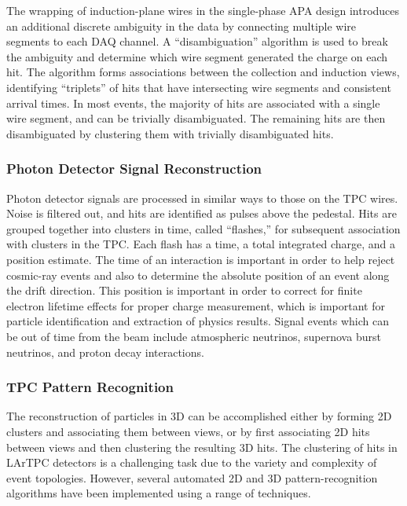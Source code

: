 The wrapping of induction-plane wires in the single-phase APA design
introduces an additional discrete ambiguity in the data by connecting multiple wire
segments to each DAQ channel. A ``disambiguation'' algorithm is used to break the
ambiguity and determine which wire segment generated the charge on each hit.
The algorithm forms associations between the collection and induction views,
identifying ``triplets'' of hits that have intersecting wire segments
and consistent arrival times. In most events, the majority of hits are
associated with a single wire segment, and can be trivially disambiguated.
The remaining hits are then disambiguated by clustering them with trivially disambiguated hits.

\subsubsection{Photon Detector Signal Reconstruction}

Photon detector signals are processed in similar ways to those on the TPC wires.
Noise is filtered out, and hits are identified as pulses above the pedestal.
Hits are grouped together into clusters in time, called ``flashes,'' for subsequent
association with clusters in the TPC.  Each flash has a time, a total integrated charge, and a position
estimate.  The time of an interaction is important in order to help reject cosmic-ray events
and also to determine the absolute position of an event along the drift direction.  This position
is important in order to correct for finite electron lifetime effects for proper charge measurement,
which is important for particle identification and extraction of physics results.  Signal events which
can be out of time from the beam include atmospheric neutrinos, supernova burst neutrinos, and proton decay
interactions.

\subsubsection{TPC Pattern Recognition}

The reconstruction of particles in 3D can be accomplished either by forming 2D clusters
and associating them between views, or by first associating 2D hits between views
and then clustering the resulting 3D hits. 
The clustering of hits in LArTPC detectors is a challenging task
due to the variety and complexity of event topologies.
However, several automated 2D and 3D pattern-recognition algorithms have been 
implemented using a range of techniques.

